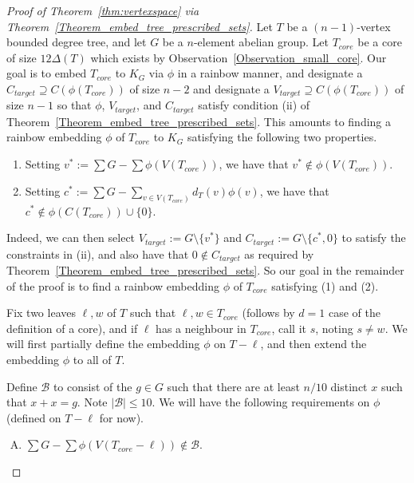 \documentclass[a4paper,11pt,hidelinks]{amsart}
\theoremstyle{definition}
\begin{document}
\begin{proof}[Proof of Theorem~\ref{thm:vertexspace} via Theorem~\ref{Theorem_embed_tree_prescribed_sets}] Let $T$ be a $(n-1)$-vertex bounded degree tree, and let $G$ be a $n$-element abelian group. Let $T_{core}$ be a core of size $12\Delta(T)$ which exists by Observation~\ref{Observation_small_core}. Our goal is to embed $T_{core}$ to $K_G$ via $\phi$ in a rainbow manner, and designate a $C_{target}\supseteq C(\phi(T_{core}))$ of size $n-2$ and designate a $V_{target}\supseteq C(\phi(T_{core}))$ of size $n-1$ so that $\phi$, $V_{target}$, and $C_{target}$ satisfy condition (ii) of Theorem~\ref{Theorem_embed_tree_prescribed_sets}. This amounts to finding a rainbow embedding $\phi$ of $T_{core}$ to $K_G$ satisfying the following two properties. 
\begin{enumerate}
\item Setting $v^*:=\sum G - \sum \phi(V(T_{core}))$, we have that $v^*\notin \phi(V(T_{core}))$.
\item Setting $c^*:=\sum G - \sum_{v\in V(T_{core})}d_T(v)\phi(v)$, we have that $c^*\notin \phi(C(T_{core}))\cup\{0\}$. 
\end{enumerate}
Indeed, we can then select $V_{target}:=G\setminus\{v^*\}$ and $C_{target}:=G\setminus\{c^*, 0\}$ to satisfy the constraints in (ii), and also have that $0\notin C_{target}$ as required by Theorem~\ref{Theorem_embed_tree_prescribed_sets}. So our goal in the remainder of the proof is to find a rainbow embedding $\phi$ of $T_{core}$ satisfying (1) and (2). 
\par Fix two leaves $\ell,w$ of $T$ such that $\ell,w\in T_{core}$ (follows by $d=1$ case of the definition of a core), and if $\ell$ has a neighbour in $T_{core}$, call it $s$, noting $s\neq w$. We will first partially define the embedding $\phi$ on $T-\ell$, and then extend the embedding $\phi$ to all of $T$. 
\par Define $\mathcal{B}$ to consist of the $g\in G$ such that there are at least $n/10$ distinct $x$ such that $x+x=g$. Note $|\mathcal{B}|\leq 10$. We will have the following requirements on $\phi$ (defined on $T-\ell$ for now).
\begin{enumerate}[(A)]
\item $\sum G- \sum \phi(V(T_{core}-\ell))\notin \mathcal{B}$. %


\end{enumerate}
\end{proof}
\end{document}
